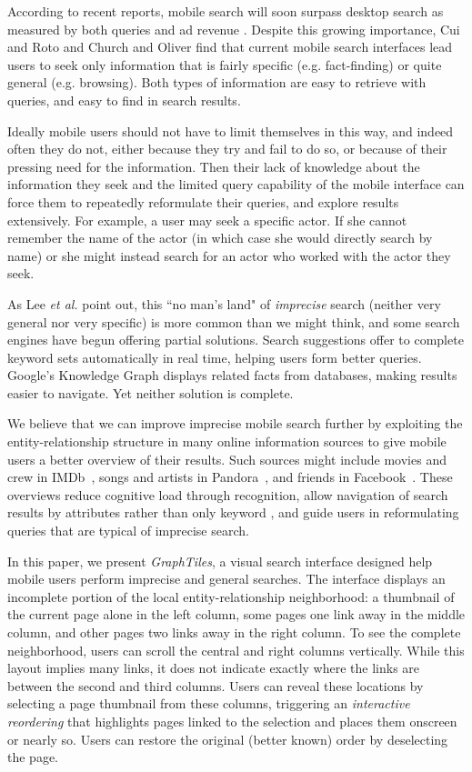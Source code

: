 According to recent reports, mobile search will soon surpass desktop search as measured by both queries and ad revenue \cite{MobileQueries}\cite{MobileRevenue}. Despite this growing importance, Cui and Roto \cite{Cui:2008} and Church and Oliver \cite{Church:2011} find that current mobile search interfaces lead users to seek only information that is fairly specific (e.g. fact-finding) or quite general (e.g. browsing). Both types of information are easy to retrieve with queries, and easy to find in search results.

Ideally mobile users should not have to limit themselves in this way, and indeed often they do not, either because they try and fail to do so, or because of their pressing need for the information. Then their lack of knowledge about the information they seek and the limited query capability of the mobile interface \cite{Kamvar:2009} can force them to repeatedly reformulate their queries, and explore results extensively. For example, a user may seek a specific actor. If she cannot remember the name of the actor (in which case she would directly search by name) or she might instead search for an actor who worked with the actor they seek.

As Lee \textit{et al.} \cite{Lee:2012} point out, this ``no man's land" of \textit{imprecise} search (neither very general nor very specific) is more common than we might think, and some search engines have begun offering partial solutions. Search suggestions offer to complete keyword sets automatically in real time, helping users form better queries. Google's Knowledge Graph \cite{GoogleKnowledgeGraph} displays related facts from databases, making results easier to navigate. Yet neither solution is complete.

We believe that we can improve imprecise mobile search further by exploiting the entity-relationship structure in many online information sources to give mobile users a better overview of their results. Such sources might include movies and crew in IMDb~\cite{imdb}, songs and artists in Pandora~\cite{pandora}, and friends in Facebook~\cite{Facebook}. These overviews reduce cognitive load through recognition, allow navigation of search results by attributes rather than only keyword \cite{Hearst:2002}, and guide users in reformulating queries that are typical of imprecise search.

In this paper, we present \textit{GraphTiles}, a visual search interface designed help mobile users perform imprecise and general searches. The interface displays an incomplete portion of the local entity-relationship neighborhood: a thumbnail of the current page alone in the left column, some pages one link away in the middle column, and other pages two links away in the right column. To see the complete neighborhood, users can scroll the central and right columns vertically. While this layout implies many links, it does not indicate exactly where the links are between the second and third columns. Users can reveal these locations by selecting a page thumbnail from these columns, triggering an \textit{interactive reordering} that highlights pages linked to the selection and places them onscreen or nearly so. Users can restore the original (better known) order by deselecting the page.